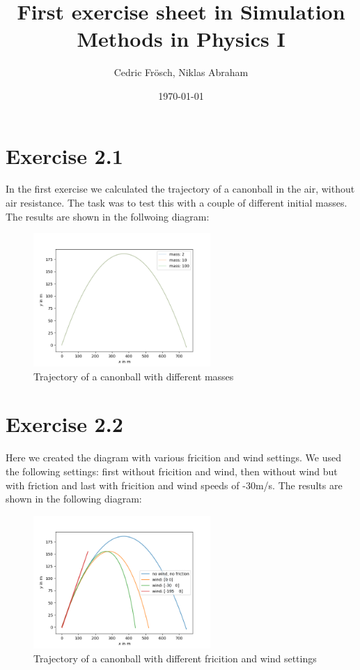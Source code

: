 \documentclass[a4paper,11pt,bibtotoc]{scrartcl}
\begin{document}
\titlehead{Simulation Methods in Physics I \hfill WS 2021/2022}
\title{First exercise sheet in Simulation Methods in Physics I}
\author{Cedric Frösch, Niklas Abraham}
\date{\today}
\publishers{Institute for Computational Physics, University of
  Stuttgart}
\maketitle

\tableofcontents

\section{Exercise 2.1}

In the first exercise we calculated the trajectory of a canonball in the air, without air resistance.
The task was to test this with a couple of different initial masses. The results are shown in the follwoing diagram:
\begin{figure}[h]
	\centering
	\includegraphics[width=0.6\textwidth]{ex_1.png}
	\caption{Trajectory of a canonball with different masses}
	\label{fig:ex_1}
\end{figure}

\section{Exercise 2.2}

Here we created the diagram with various fricition and wind settings. We used the following settings: first without fricition and wind, then without wind but with friction and last with fricition and wind speeds of -30m/s.
The results are shown in the following diagram:
\begin{figure}[!htbp]
	\centering
	\includegraphics[width=0.6\textwidth]{ex_2_1.png}
	\caption{Trajectory of a canonball with different fricition and wind settings}
	\label{fig:ex_2_2}
\end{figure}
\end{document}
